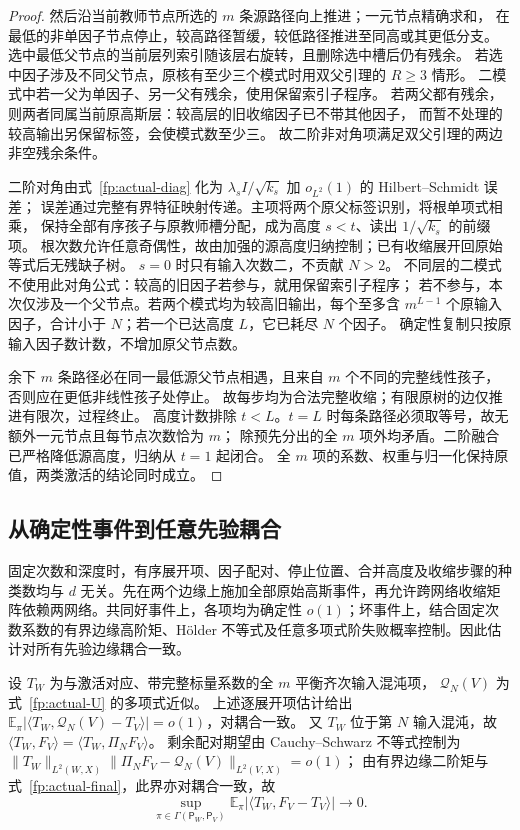 \documentclass[a4paper]{tufte-handout}
\begin{document}
\begin{fullwidth}
\begin{proof}
然后沿当前教师节点所选的 $m$ 条源路径向上推进；一元节点精确求和，
在最低的非单因子节点停止，较高路径暂缓，较低路径推进至同高或其更低分支。
选中最低父节点的当前层列索引随该层右旋转，且删除选中槽后仍有残余。
若选中因子涉及不同父节点，原核有至少三个模式时用双父引理的 $R\ge3$ 情形。
二模式中若一父为单因子、另一父有残余，使用保留索引子程序。
若两父都有残余，则两者同属当前原高斯层：较高层的旧收缩因子已不带其他因子，
而暂不处理的较高输出另保留标签，会使模式数至少三。
故二阶非对角项满足双父引理的两边非空残余条件。

二阶对角由式~\eqref{fp:actual-diag} 化为
$\lambda_sI/\sqrt{k_s}$ 加 $o_{L^2}(1)$ 的 Hilbert--Schmidt 误差；
误差通过完整有界特征映射传递。主项将两个原父标签识别，将根单项式相乘，
保持全部有序孩子与原教师槽分配，成为高度 $s<t$、读出 $1/\sqrt{k_s}$ 的前缀项。
根次数允许任意奇偶性，故由加强的源高度归纳控制；已有收缩展开回原始等式后无残缺子树。
$s=0$ 时只有输入次数二，不贡献 $N>2$。
不同层的二模式不使用此对角公式：较高的旧因子若参与，就用保留索引子程序；
若不参与，本次仅涉及一个父节点。若两个模式均为较高旧输出，每个至多含
$m^{L-1}$ 个原输入因子，合计小于 $N$；若一个已达高度 $L$，它已耗尽 $N$ 个因子。
确定性复制只按原输入因子数计数，不增加原父节点数。

余下 $m$ 条路径必在同一最低源父节点相遇，且来自
$m$ 个不同的完整线性孩子，否则应在更低非线性孩子处停止。
故每步均为合法完整收缩；有限原树的边仅推进有限次，过程终止。
高度计数排除 $t<L$。$t=L$ 时每条路径必须取等号，故无额外一元节点且每节点次数恰为 $m$；
除预先分出的全 $m$ 项外均矛盾。二阶融合已严格降低源高度，归纳从 $t=1$ 起闭合。
全 $m$ 项的系数、权重与归一化保持原值，两类激活的结论同时成立。
\end{proof}


\subsection{从确定性事件到任意先验耦合}\label{fp:coupling-uniform}
固定次数和深度时，有序展开项、因子配对、停止位置、合并高度及收缩步骤的种类数均与 $d$ 无关。先在两个边缘上施加全部原始高斯事件，再允许跨网络收缩矩阵依赖两网络。共同好事件上，各项均为确定性 $o(1)$；坏事件上，结合固定次数系数的有界边缘高阶矩、H\"older 不等式及任意多项式阶失败概率控制。因此估计对所有先验边缘耦合一致。

设 $T_W$ 为与激活对应、带完整标量系数的全 $m$ 平衡齐次输入混沌项，
$\mathcal Q_N(V)$ 为式~\eqref{fp:actual-U} 的多项式近似。
上述逐展开项估计给出 $\mathbb E_\pi|\langle T_W,\mathcal Q_N(V)-T_V\rangle|=o(1)$，对耦合一致。
又 $T_W$ 位于第 $N$ 输入混沌，故 $\langle T_W,F_V\rangle=\langle T_W,\Pi_NF_V\rangle$。
剩余配对期望由 Cauchy--Schwarz 不等式控制为
$\|T_W\|_{L^2(W,X)}\|\Pi_NF_V-\mathcal Q_N(V)\|_{L^2(V,X)}=o(1)$；
由有界边缘二阶矩与式~\eqref{fp:actual-final}，此界亦对耦合一致，故
\begin{equation}\label{fp:global-function-pairing}
 \boxed{\displaystyle
 \sup_{\pi\in\Gamma(\mathsf P_W,\mathsf P_V)}
 \mathbb E_\pi|\langle T_W,F_V-T_V\rangle|\longrightarrow0.}
\end{equation}


\end{fullwidth}
\end{document}
